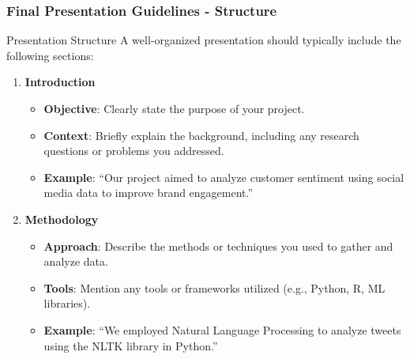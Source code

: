 \documentclass[aspectratio=169]{beamer}
\begin{document}
\begin{frame}[fragile]
    \frametitle{Final Presentation Guidelines - Structure}
    \begin{block}{Presentation Structure}
        A well-organized presentation should typically include the following sections:
    \end{block}
    \begin{enumerate}
        \item \textbf{Introduction}
            \begin{itemize}
                \item \textbf{Objective}: Clearly state the purpose of your project.
                \item \textbf{Context}: Briefly explain the background, including any research questions or problems you addressed.
                \item \textbf{Example}: ``Our project aimed to analyze customer sentiment using social media data to improve brand engagement.''
            \end{itemize}
        
        \item \textbf{Methodology}
            \begin{itemize}
                \item \textbf{Approach}: Describe the methods or techniques you used to gather and analyze data.
                \item \textbf{Tools}: Mention any tools or frameworks utilized (e.g., Python, R, ML libraries).
                \item \textbf{Example}: ``We employed Natural Language Processing to analyze tweets using the NLTK library in Python.''
            \end{itemize}
    \end{enumerate}
\end{frame}
\end{document}
